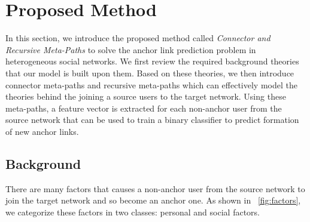 \documentclass[conference]{IEEEtran}
\begin{document}
\section{Proposed Method}\label{sec:method}

In this section, we introduce the proposed method called \textit{Connector and Recursive Meta-Paths} to solve the anchor link prediction problem in heterogeneous social networks. We first review the required background theories that our model is built upon them. Based on these theories, we then introduce connector meta-paths and recursive meta-paths which can effectively model the theories behind the joining a source users to the target network. Using these meta-paths, a feature vector is extracted for each non-anchor user from the source network that can be used to train a binary classifier to predict formation of new anchor links.

\subsection{Background}\label{sec:method:factors}

There are many factors that causes a non-anchor user from the source network to join the target network and so become an anchor one. As shown in \figurename~\ref{fig:factors}, we categorize these factors in two classes: personal and social factors.
\end{document}
